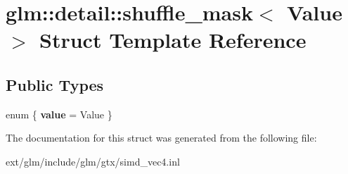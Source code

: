 \hypertarget{structglm_1_1detail_1_1shuffle__mask}{\section{glm\-:\-:detail\-:\-:shuffle\-\_\-mask$<$ Value $>$ Struct Template Reference}
\label{structglm_1_1detail_1_1shuffle__mask}
}
\subsection*{Public Types}
\begin{DoxyCompactItemize}
\item 
enum \{ {\bfseries value} = Value
 \}
\end{DoxyCompactItemize}


The documentation for this struct was generated from the following file\-:\begin{DoxyCompactItemize}
\item 
ext/glm/include/glm/gtx/simd\-\_\-vec4.\-inl\end{DoxyCompactItemize}
